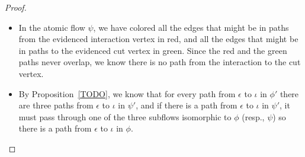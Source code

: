 
\begin{proof}
\begin{itemize}
	\item In the atomic flow $\psi$, we have colored all the edges that might be in paths from the evidenced interaction vertex in red, and all the edges that might be in paths to the evidenced cut vertex in green. Since the red and the green paths never overlap, we know there is no path from the interaction to the cut vertex.
	\item By Proposition~\vref{TODO}, we know that for every path from $\epsilon$ to $\iota$ in $\phi'$ there are three paths from $\epsilon$ to $\iota$ in $\psi'$, and if there is a path from $\epsilon$ to $\iota$ in $\psi'$, it must pass through one of the three subflows isomorphic to $\phi$ (resp., $\psi$) so there is a path from $\epsilon$ to $\iota$ in $\phi$.
\end{itemize}
\end{proof}

